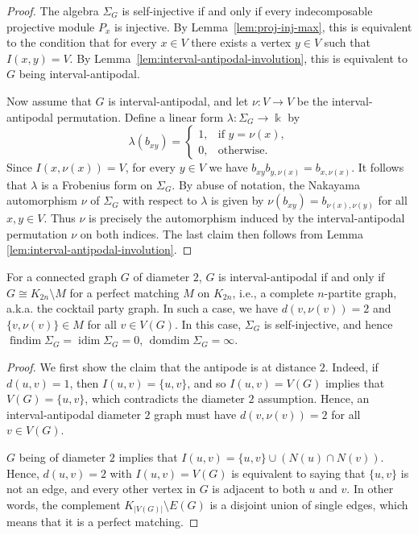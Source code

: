 \documentclass[a4paper,leqno]{amsart}
\begin{document}
\begin{proof}
The algebra $\Sigma_G$ is self-injective if and only if every indecomposable projective module $P_x$ is injective. By Lemma~\ref{lem:proj-inj-max}, this is equivalent to the condition that for every $x\in V$ there exists a vertex $y\in V$ such that $I(x,y)=V$. By Lemma~\ref{lem:interval-antipodal-involution}, this is equivalent to $G$ being interval-antipodal.

Now assume that $G$ is interval-antipodal, and let $\nu:V\to V$ be the interval-antipodal permutation. Define a linear form $\lambda:\Sigma_G\to \Bbbk$ by
$$\lambda(b_{xy})=
\begin{cases}
1, & \text{if } y=\nu(x),\\
0, & \text{otherwise}.
\end{cases}$$
Since $I(x,\nu(x))=V$, for every $y\in V$ we have $b_{xy}b_{y,\nu(x)}=b_{x,\nu(x)}$. It follows that $\lambda$ is a Frobenius form on $\Sigma_G$. By abuse of notation, the Nakayama automorphism $\nu$ of $\Sigma_G$ with respect to $\lambda$ is given by
$\nu(b_{xy})=b_{\nu(x),\nu(y)}$ for all $x,y\in V$. Thus $\nu$ is precisely the automorphism induced by the interval-antipodal permutation $\nu$ on both indices. The last claim then follows from Lemma \ref{lem:interval-antipodal-involution}.
\end{proof}


\begin{prop}\label{prop:diam2 int-antipodal <=> cocktail party}
For a connected graph $G$ of diameter $2$, $G$ is interval-antipodal if and only if $G\cong K_{2n}\setminus M$ for a perfect matching $M$ on $K_{2n}$, i.e., a complete $n$-partite graph, a.k.a. the cocktail party graph.
In such a case, we have $d(v,\nu(v))=2$ and $\{v,\nu(v)\}\in M$ for all $v\in V(G)$.
In this case, $\Sigma_G$ is self-injective, and hence
$\operatorname{findim}\Sigma_G=\operatorname{idim}\Sigma_G=0$, $\operatorname{domdim}\Sigma_G=\infty$.
\end{prop}
\begin{proof}
We first show the claim that the antipode is at distance $2$.
Indeed, if $d(u,v)=1$, then $I(u,v)=\{u,v\}$, and so $I(u,v)=V(G)$ implies that $V(G)=\{u,v\}$, which contradicts the diameter $2$ assumption.  Hence, an interval-antipodal diameter $2$ graph must have $d(v,\nu(v))=2$ for all $v\in V(G)$.

$G$ being of diameter $2$ implies that $I(u,v)=\{u,v\}\cup (N(u)\cap N(v))$.  Hence, $d(u,v)=2$ with $I(u,v)=V(G)$ is equivalent to saying that $\{u,v\}$ is not an edge, and every other vertex in $G$ is adjacent to both $u$ and $v$.  In other words, the complement $K_{|V(G)|}\setminus E(G)$ is a disjoint union of single edges, which means that it is a perfect matching.
\end{proof}
\end{document}
